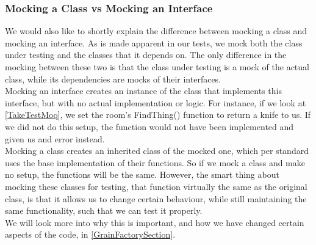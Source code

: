 \subsubsection{Mocking a Class vs Mocking an Interface} \label{MockingVsSection}
We would also like to shortly explain the difference between mocking a class and mocking an interface. As is made apparent in our tests, we mock both the class under testing and the classes that it depends on. The only difference in the mocking between these two is that the class under testing is a mock of the actual class, while its dependencies are mocks of their interfaces. \\
Mocking an interface creates an instance of the class that implements this interface, but with no actual implementation or logic. For instance, if we look at \autoref{TakeTestMoq}, we set the room's FindThing() function to return a knife to us. If we did not do this setup, the function would not have been implemented and given us and error instead.  \\
Mocking a class creates an inherited class of the mocked one, which per standard uses the base implementation of their functions. So if we mock a class and make no setup, the functions will be the same. However, the smart thing about mocking these classes for testing, that function virtually the same as the original class, is that it allows us to change certain behaviour, while still maintaining the same functionality, such that we can test it properly. \\
We will look more into why this is important, and how we have changed certain aspects of the code, in \autoref{GrainFactorySection}. 

